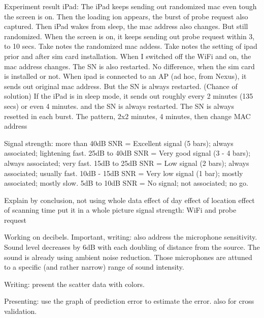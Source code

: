 Experiment result iPad:
The iPad keeps sending out randomized mac even tough the screen is on.
Then the loading ion appears, the burst of probe request also captured.
Then iPad wakes from sleep, the mac address also changes. But still randomized.
When the screen is on, it keeps sending out probe request within 3, to 10 secs.
Take notes the randomized mac addess.
Take notes the setting of ipad prior and after sim card installation.
When I switched off the WiFi and on, the mac address changes. The SN is also restarted.
No difference, when the sim card is installed or not.
When ipad is connected to an AP (ad hoc, from Nexus), it sends out original mac address.
But the SN is always restarted. (Chance of solution)
If the iPad is in sleep mode, it sends out roughly every 2 minutes (135 secs) or even 4 minutes. and the SN is always restarted.
The SN is always resetted in each burst.
The pattern, 2x2 minutes, 4 minutes, then change MAC address

Signal strength:
more than 40dB SNR = Excellent signal (5 bars); always associated; lightening fast.
25dB to 40dB SNR = Very good signal (3 - 4 bars); always associated; very fast.
15dB to 25dB SNR = Low signal (2 bars); always associated; usually fast.
10dB - 15dB SNR = Very low signal (1 bar); mostly associated; mostly slow.
5dB to 10dB SNR = No signal; not associated; no go.

Explain by conclusion, not using whole data
effect of day
effect of location
effect of scanning time
put it in a whole picture
signal strength: WiFi and probe request

Working on decibels.
Important, writing: also address the microphone sensitivity.
Sound level decreases by 6dB with each doubling of distance from the source.
The sound is already using ambient noise reduction.
Those microphones are attuned to a specific (and rather narrow) range of sound intensity.

Writing: present the scatter data with colors.

Presenting: use the graph of prediction error to estimate the error.
also for cross validation.

